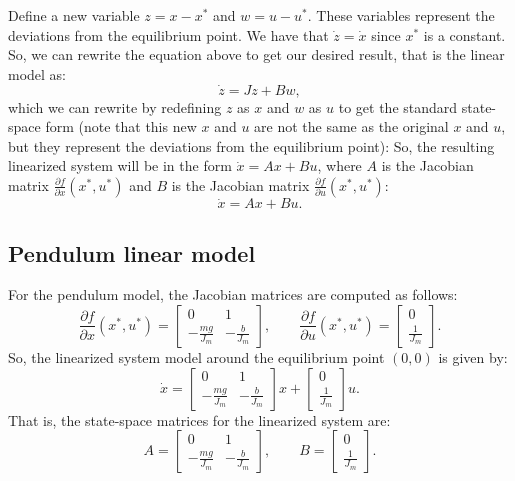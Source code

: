 \documentclass{ee122_notes}
\begin{document}
Define a new variable $z = x - x^*$ and $w = u - u^*$. These variables represent the deviations from the equilibrium point. We have that $\dot z = \dot x$ since $x^*$ is a constant. So, we can rewrite the equation above to get our desired result, that is the linear model as:
\[
\dot z = J z + B w,
\]
which we can rewrite by redefining $z$ as $x$ and $w$ as $u$ to get the standard state-space form (note that this new $x$ and $u$ are not the same as the original $x$ and $u$, but they represent the deviations from the equilibrium point):
So, the resulting linearized system will be in the form $\dot x = Ax + Bu$, where $A$ is the Jacobian matrix $\frac{\partial f}{\partial x}(x^*, u^*)$ and $B$ is the Jacobian matrix $\frac{\partial f}{\partial u}(x^*, u^*)$:
\[
\dot x = Ax + Bu.
\]

\subsection{Pendulum linear model}
For the pendulum model, the Jacobian matrices are computed as follows:
\[
\frac{\partial f}{\partial x}(x^*, u^*) = \begin{bmatrix}
0 & 1\\
-\frac{mg}{J_m} & -\frac{b}{J_m}
\end{bmatrix},
\qquad
\frac{\partial f}{\partial u}(x^*, u^*) = \begin{bmatrix}
0\\
\frac{1}{J_m}
\end{bmatrix}.
\]
So, the linearized system model around the equilibrium point $(0,0)$ is given by:
\[
\dot x = \begin{bmatrix}
0 & 1\\
-\frac{mg}{J_m} & -\frac{b}{J_m}
\end{bmatrix}x + \begin{bmatrix}
0\\
\frac{1}{J_m}
\end{bmatrix}u.
\]
That is, the state-space matrices for the linearized system are:
\[
A = \begin{bmatrix}
0 & 1\\
-\frac{mg}{J_m} & -\frac{b}{J_m}
\end{bmatrix},
\qquad
B = \begin{bmatrix}
0\\
\frac{1}{J_m}
\end{bmatrix}.
\]
\end{document}
